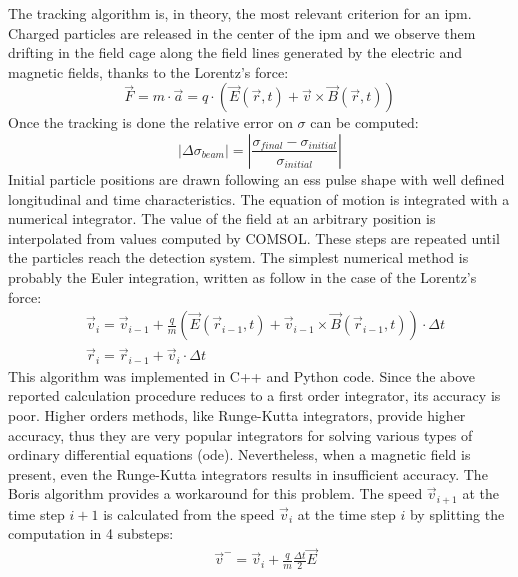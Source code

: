 \begin{refsection}
  The tracking algorithm is, in theory, the most relevant criterion for an \acrshort{ipm}. Charged particles are released in the center of the \acrshort{ipm} and we observe them drifting in the field cage along the field lines generated by the electric and magnetic fields, thanks to the Lorentz’s force:
  \begin{equation}
    \vec{F} = m \cdot \vec{a} = q \cdot (\vec{E}(\vec{r},t) + \vec{v} \times \vec{B}(\vec{r},t))
  \end{equation}
  Once the tracking is done the relative error on $\sigma$ can be computed:
  \begin{equation}
    \left| \Delta \sigma_{beam} \right| = \left|\frac{\sigma_{final} - \sigma_{initial}}{\sigma_{initial}} \right|
  \end{equation}
  Initial particle positions are drawn following an \acrshort{ess} pulse shape with well defined longitudinal and time characteristics. The equation of motion is integrated with a numerical integrator. The value of the field at an arbitrary position is interpolated from values computed by COMSOL. These steps are repeated until the particles reach the detection system. The simplest numerical method is probably the Euler integration, written as follow in the case of the Lorentz’s force:
  \begin{align}
     & \vec{v}_{i} = \vec{v}_{i-1} + \frac{q}{m}(\vec{E}(\vec{r}_{i-1},t) + \vec{v}_{i-1} \times \vec{B}(\vec{r}_{i-1},t)) \cdot \Delta t \\
     & \vec{r}_{i} = \vec{r}_{i-1} + \vec{v}_{i} \cdot \Delta t
  \end{align}
  This algorithm was implemented in C++ and Python code. Since the above reported calculation procedure reduces to a first order integrator, its accuracy is poor. Higher orders methods, like Runge-Kutta integrators, provide higher accuracy, thus they are very popular integrators for solving various types of ordinary differential equations (\acrshort{ode}). Nevertheless, when a magnetic field is present, even the Runge-Kutta integrators results in insufficient accuracy.
  The Boris algorithm \cite{Boris1970} provides a workaround for this problem. The speed $\vec{v}_{i+1}$ at the time step $i+1$ is calculated from the speed $\vec{v}_{i}$ at the time step $i$ by splitting the computation in 4 substeps:
  \begin{align}
     & \vec{v}^{-} = \vec{v}_{i} + \frac{q}{m} \frac{\Delta t}{2}\vec{E}                                                                 \\

\end{align}
\end{refsection}

